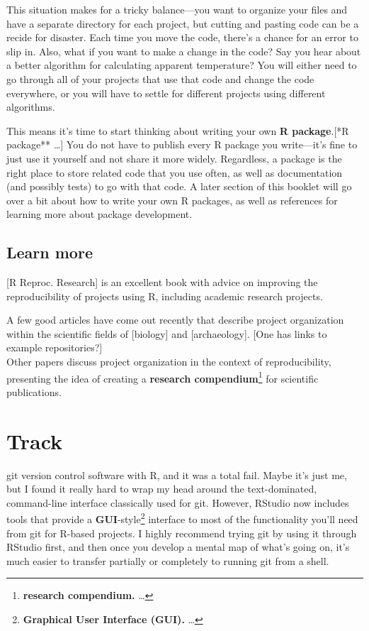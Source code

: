 \documentclass[]{tufte-book}
\begin{document}
This situation makes for a tricky balance---you want to organize your files and have a separate
directory for each project, but cutting and pasting code can be a recide for disaster. Each time
you move the code, there's a chance for an error to slip in. Also, what if you want to make a change
in the code? Say you hear about a better algorithm for calculating apparent temperature?
You will either need to go through all of your projects that use that code and change the code
everywhere, or you will have to settle for different projects using different algorithms.

This means it's time to start thinking about writing your own \textbf{R package}.{[}\citet{*}*R package** \ldots{}{]}
You do not have to publish every R package you write---it's fine to just use it yourself and not
share it more widely. Regardless, a package is the right place to store related code that you use
often, as well as documentation (and possibly tests) to go with that code. A later section of this
booklet will go over a bit about how to write your own R packages, as well as references for
learning more about package development.

\hypertarget{learn-more}{%
\section{Learn more}\label{learn-more}}

{[}R Reproc. Research{]} is an excellent book with advice on improving the reproducibility of
projects using R, including academic research projects.

A few good articles have come out recently that describe project organization within
the scientific fields of {[}biology{]} and {[}archaeology{]}. {[}One has links to example repositories?{]}\\
Other papers discuss project organization in the context of reproducibility, presenting
the idea of creating a \textbf{research compendium}\footnote{\textbf{research compendium.} \ldots{}} for scientific
publications.

\hypertarget{track}{%
\chapter{Track}\label{track}}

 git version control software with R, and
it was a total fail. Maybe it's just me, but I found it really hard to wrap my head around
the text-dominated, command-line interface classically used for git. However, RStudio now
includes tools that provide a \textbf{GUI}-style\footnote{\textbf{Graphical User Interface (GUI).} \ldots{}}
interface to most of the functionality you'll need from git for R-based projects. I highly
recommend trying git by using it through RStudio first, and then once you develop a mental
map of what's going on, it's much easier to transfer partially or completely to running git
from a shell.
\end{document}
